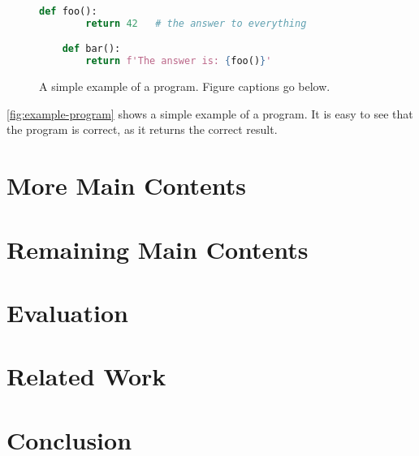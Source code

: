 \documentclass[thesis]{plai}
\begin{document}
\lipsum[2-8]

\begin{figure}[t]
    \begin{lstlisting}[language=Python, gobble=4]
    def foo():
        return 42   # the answer to everything

    def bar():
        return f'The answer is: {foo()}'
    \end{lstlisting}
    \caption{A simple example of a program. Figure captions go below.}
    \label{fig:example-program}
\end{figure}

\autoref{fig:example-program} shows a simple example of a program.
It is easy to see that the program is correct, as it returns the correct result.

\chapter{More Main Contents}
\label{chapter:content2}

\lipsum[2-3]


\chapter{Remaining Main Contents}
\label{chapter:content3}

\lipsum[2-3]

\chapter{Evaluation}
\label{chapter:evaluation}



\chapter{Related Work}
\label{chapter:related-work}



\chapter{Conclusion}
\label{chapter:conclusion}






\appendix



\end{document}
